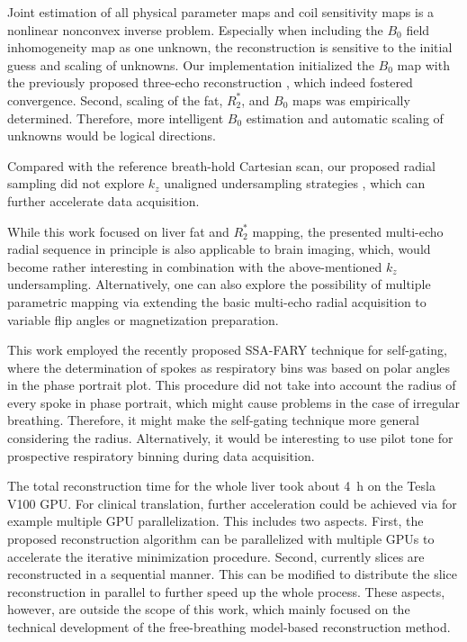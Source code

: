 \documentclass[journal,twoside,web]{ieeecolor}
\begin{document}
Joint estimation of all physical parameter maps 
and coil sensitivity maps is a nonlinear nonconvex inverse problem. 
Especially when including the $B_0$ field inhomogeneity map as one unknown, 
the reconstruction is sensitive to the initial guess and scaling of unknowns. 
Our implementation initialized the $B_0$ map 
with the previously proposed three-echo reconstruction \cite{tan_2019_mobawf}, 
which indeed fostered convergence. 
Second, scaling of the fat, $R_2^*$, and $B_0$ maps was 
empirically determined. Therefore, more intelligent $B_0$ estimation 
and automatic scaling of unknowns \cite{tan_2017_scalemobaflow} 
would be logical directions. 

Compared with the reference breath-hold Cartesian scan, 
our proposed radial sampling did not explore 
$k_z$ unaligned undersampling strategies \cite{breuer_2005_caipi}, 
which can further accelerate data acquisition.

While this work focused on liver fat and $R_2^*$ mapping, 
the presented multi-echo radial sequence in principle 
is also applicable to brain imaging, which, 
would become rather interesting in combination with 
the above-mentioned $k_z$ undersampling. 
Alternatively, one can also explore the possibility of 
multiple parametric mapping 
via extending the basic multi-echo radial acquisition to 
variable flip angles or magnetization preparation.

This work employed the recently proposed SSA-FARY technique 
for self-gating, where the determination of spokes as respiratory bins 
was based on polar angles in the phase portrait plot. 
This procedure did not take into account the radius of every spoke 
in phase portrait, which might cause problems in the case of irregular breathing. 
Therefore, it might make the self-gating technique more general considering the radius. Alternatively, it would be interesting to use 
pilot tone \cite{solomon_2021_pilot_tone} for prospective respiratory binning 
during data acquisition. 

The total reconstruction time for the whole liver took about \mbox{\SI{4}{\hour}} 
on the Tesla V100 GPU. For clinical translation, 
further acceleration could be achieved via 
for example multiple GPU parallelization. 
This includes two aspects. 
First, the proposed reconstruction algorithm 
can be parallelized with multiple GPUs 
to accelerate the iterative minimization procedure.
Second, currently slices are reconstructed in a sequential manner. 
This can be modified to distribute the slice reconstruction in parallel 
to further speed up the whole process.
These aspects, however, are outside the scope of this work, 
which mainly focused on the technical development 
of the free-breathing model-based reconstruction method.
\end{document}
